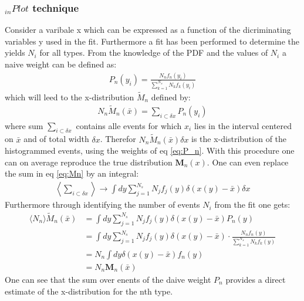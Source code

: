 \documentclass[english]{uzhpub}
\begin{document}
 \subsubsection{$_{in} Plot$ technique}
 Consider a varibale x which can be expressed as a function of the dicriminating variables y used in the fit. Furthermore a fit has been performed to determine the yields $N_i$ for all types. From the knowledge of the PDF and the values of $N_i$ a naive weight can be defined as:
 \begin{align}
  P_n(y_i) = \frac{N_n f_n(y_i)}{\sum_{k=1}^{N_s} N_k f_k(y_i)} \label{eq:P_n}
 \end{align}
 which will leed to the x-distribution $\tilde{M}_n$ defined by:
 \begin{align}
  N_n \tilde{M}_n (\bar{x}) = \sum_{i \subset \delta x} P_n (y_i) \label{eq:Mn}
 \end{align}
 where sum $\sum_{i \subset \delta x}$ contains alle events for which $x_i$ lies in the interval centered on $\bar{x}$ and of total width $\delta x$.
 Therefor $N_n \tilde{M}_n (\bar{x}) \delta x$ is the x-distribution of the histogrammed events, using the weights of eq \ref{eq:P_n}.
 With this procedure one can on average reproduce the true distribution $\textbf{M}_n(x)$. One can even replace the sum in eq \ref{eq:Mn} by an integral:
 \begin{align}
  \left \langle \sum_{i \subset \delta x} \right \rangle \rightarrow \int dy \sum_{j=1}^{N_s} N_j f_j (y) \delta (x(y) - \bar{x}) \delta x \label{eq:average}
 \end{align}
 Furthermore through identifying the number of events $N_i$ from the fit one gets:
 \begin{align}
  \langle N_n \rangle \tilde{M}_n (\bar{x}) & = \int dy \sum_{j=1}^{N_s} N_j f_j (y) \delta (x(y) - \bar{x}) P_n (y)                                               \\
                                            & = \int dy \sum_{j=1}^{N_s} N_j f_j (y) \delta (x(y)- \bar{x}) \cdot \frac{N_n f_n (y)}{\sum_{k=1}^{N_s} N_k f_k (y)} \\
                                            & = N_n \int dy \delta (x(y) - \bar{x}) f_n (y)                                                                        \\
                                            & = N_n \textbf{M}_n(\bar{x}) \label{eq:N_nM_n}
 \end{align}
 One can see that the sum over enents of the daive weight $P_n$ provides a direct estimate of the x-distribution for the nth type.
\end{document}
